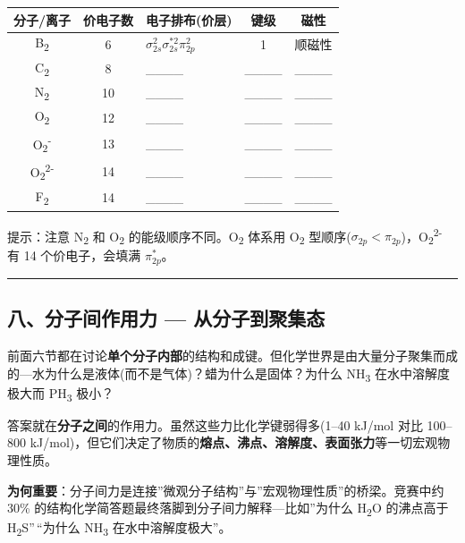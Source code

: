 {\def\LTcaptype{none} %
\begin{longtable}[]{@{}cclcc@{}}
\toprule\noalign{}
分子/离子 & 价电子数 & 电子排布(价层) & 键级 & 磁性 \\
\midrule\noalign{}
\endhead
\bottomrule\noalign{}
\endlastfoot
B\textsubscript{2} & 6 & \(\sigma_{2s}^2 \sigma_{2s}^{*2} \pi_{2p}^2\) & 1 & 顺磁性 \\
C\textsubscript{2} & 8 & \_\_\_\_ & \_\_\_\_ & \_\_\_\_ \\
N\textsubscript{2} & 10 & \_\_\_\_ & \_\_\_\_ & \_\_\_\_ \\
O\textsubscript{2} & 12 & \_\_\_\_ & \_\_\_\_ & \_\_\_\_ \\
O\textsubscript{2}\textsuperscript{-} & 13 & \_\_\_\_ & \_\_\_\_ & \_\_\_\_ \\
O\textsubscript{2}\textsuperscript{2-} & 14 & \_\_\_\_ & \_\_\_\_ & \_\_\_\_ \\
F\textsubscript{2} & 14 & \_\_\_\_ & \_\_\_\_ & \_\_\_\_ \\
\end{longtable}
}

提示：注意 N\textsubscript{2} 和 O\textsubscript{2} 的能级顺序不同。O\textsubscript{2} 体系用 O\textsubscript{2} 型顺序(\(\sigma_{2p}<\pi_{2p}\))，O\textsubscript{2}\textsuperscript{2-} 有 14 个价电子，会填满 \(\pi_{2p}^*\)。

\begin{center}\rule{0.5\linewidth}{0.5pt}\end{center}

\subsection{八、分子间作用力 --- 从分子到聚集态}\label{ux516bux5206ux5b50ux95f4ux4f5cux7528ux529b-ux4eceux5206ux5b50ux5230ux805aux96c6ux6001}

前面六节都在讨论\textbf{单个分子内部}的结构和成键。但化学世界是由大量分子聚集而成的---水为什么是液体(而不是气体)？蜡为什么是固体？为什么 NH\textsubscript{3} 在水中溶解度极大而 PH\textsubscript{3} 极小？

答案就在\textbf{分子之间}的作用力。虽然这些力比化学键弱得多(1--40 kJ/mol 对比 100--800 kJ/mol)，但它们决定了物质的\textbf{熔点、沸点、溶解度、表面张力}等一切宏观物理性质。

\textbf{为何重要}：分子间力是连接''微观分子结构''与''宏观物理性质''的桥梁。竞赛中约 30\% 的结构化学简答题最终落脚到分子间力解释---比如''为什么 H\textsubscript{2}O 的沸点高于 H\textsubscript{2}S''\,``为什么 NH\textsubscript{3} 在水中溶解度极大''。

